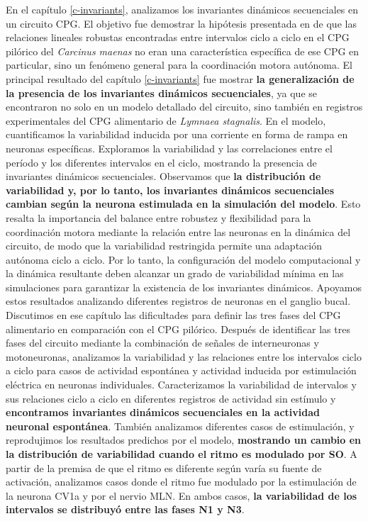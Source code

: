 En el capítulo \ref{c-invariants}, analizamos los invariantes dinámicos secuenciales en un circuito CPG. El objetivo fue demostrar la hipótesis presentada en \textcite{elices_robust_2019} de que las relaciones lineales robustas encontradas entre intervalos ciclo a ciclo en el CPG pilórico del \textit{Carcinus maenas} no eran una característica específica de ese CPG en particular, sino un fenómeno general para la coordinación motora autónoma. El principal resultado del capítulo \ref{c-invariants} fue mostrar \textbf{la generalización de la presencia de los invariantes dinámicos secuenciales}, ya que se encontraron no solo en un modelo detallado del circuito, sino también en registros experimentales del CPG alimentario de \textit{Lymnaea stagnalis}. En el modelo, cuantificamos la variabilidad inducida por una corriente en forma de rampa en neuronas específicas. Exploramos la variabilidad y las correlaciones entre el período y los diferentes intervalos en el ciclo, mostrando la presencia de invariantes dinámicos secuenciales. Observamos que \textbf{la distribución de variabilidad y, por lo tanto, los invariantes dinámicos secuenciales cambian según la neurona estimulada en la simulación del modelo}. Esto resalta la importancia del balance entre robustez y flexibilidad para la coordinación motora mediante la relación entre las neuronas en la dinámica del circuito, de modo que la variabilidad restringida permite una adaptación autónoma ciclo a ciclo. Por lo tanto, la configuración del modelo computacional y la dinámica resultante deben alcanzar un grado de variabilidad mínima en las simulaciones para garantizar la existencia de los invariantes dinámicos. Apoyamos estos resultados analizando diferentes registros de neuronas en el ganglio bucal. Discutimos en ese capítulo las dificultades para definir las tres fases del CPG alimentario en comparación con el CPG pilórico. Después de identificar las tres fases del circuito mediante la combinación de señales de interneuronas y motoneuronas, analizamos la variabilidad y las relaciones entre los intervalos ciclo a ciclo para casos de actividad espontánea y actividad inducida por estimulación eléctrica en neuronas individuales. Caracterizamos la variabilidad de intervalos y sus relaciones ciclo a ciclo en diferentes registros de actividad sin estímulo y \textbf{encontramos invariantes dinámicos secuenciales en la actividad neuronal espontánea}. También analizamos diferentes casos de estimulación, y reprodujimos los resultados predichos por el modelo, \textbf{mostrando un cambio en la distribución de variabilidad cuando el ritmo es modulado por SO}. A partir de la premisa de que el ritmo es diferente según varía su fuente de activación, analizamos casos donde el ritmo fue modulado por la estimulación de la neurona CV1a y por el nervio MLN. En ambos casos, \textbf{la variabilidad de los intervalos se distribuyó entre las fases N1 y N3}.


